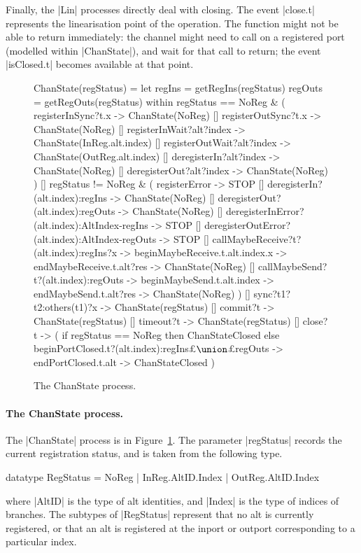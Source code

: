 Finally, the |Lin| processes directly deal with closing.  The event |close.t|
represents the linearisation point of the operation.  The 
function might not be able to return immediately: the channel might need to
call  on a registered port (modelled within |ChanState|),
and wait for that call to return; the event |isClosed.t| becomes available at
that point.

 
\begin{figure}
\begin{cspm}
ChanState(regStatus) = 
  let regIns = getRegIns(regStatus)
      regOuts = getRegOuts(regStatus)
  within
  regStatus == NoReg & (
    registerInSync?t.x -> ChanState(NoReg) 
    [] registerOutSync?t.x -> ChanState(NoReg)
    [] registerInWait?alt?index -> ChanState(InReg.alt.index)
    [] registerOutWait?alt?index -> ChanState(OutReg.alt.index)
    [] deregisterIn?alt?index ->  ChanState(NoReg)
    [] deregisterOut?alt?index ->  ChanState(NoReg)
  )
  []
  regStatus != NoReg & (
    registerError -> STOP
    [] deregisterIn?(alt.index):regIns ->  ChanState(NoReg)
    [] deregisterOut?(alt.index):regOuts -> ChanState(NoReg)
    [] deregisterInError?(alt.index):AltIndex-regIns -> STOP
    [] deregisterOutError?(alt.index):AltIndex-regOuts -> STOP
    [] callMaybeReceive?t?(alt.index):regIns?x -> beginMaybeReceive.t.alt.index.x -> 
         endMaybeReceive.t.alt?res -> ChanState(NoReg)
    [] callMaybeSend?t?(alt.index):regOuts -> beginMaybeSend.t.alt.index -> 
         endMaybeSend.t.alt?res -> ChanState(NoReg)
  )
  [] 
  sync?t1?t2:others(t1)?x -> ChanState(regStatus)
  []
  commit?t -> ChanState(regStatus)
  []
  timeout?t -> ChanState(regStatus)
  []
  close?t -> (
    if regStatus == NoReg then ChanStateClosed
    else    
      beginPortClosed.t?(alt.index):regIns£$\union$£regOuts ->
      endPortClosed.t.alt -> ChanStateClosed
  )
\end{cspm}
\caption{The {\scalashape ChanState} process.  \label{fig:ChanState}}
\end{figure}


\paragraph{The {\cspmstyle ChanState} process.}

The |ChanState| process is in Figure~\ref{fig:ChanState}.  The parameter
|regStatus| records the current registration status, and is taken from the
following type.
%
\begin{cspm}
datatype RegStatus = NoReg | InReg.AltID.Index | OutReg.AltID.Index
\end{cspm}
%
where |AltID| is the type of alt identities, and |Index| is the type of
indices of branches.  The subtypes of |RegStatus| represent that no alt is
currently registered, or that an alt is registered at the inport or outport
corresponding to a particular index.  

